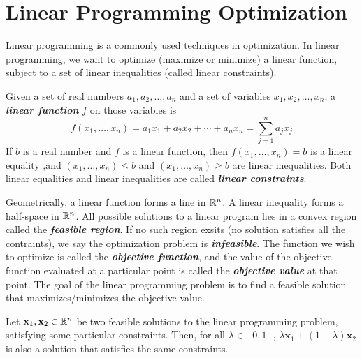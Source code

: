 \section{Linear Programming Optimization}

Linear programming is a commonly used techniques in optimization. In linear programming, we want to optimize (maximize or minimize) a linear function, subject to a set of linear inequalities (called linear constraints). 

\begin{definition}    
    Given a set of real numbers $a_1,a_2,\ldots,a_n$ and a set of variables $x_1,x_2,\ldots,x_n$, a \textit{\textbf{linear function}} $f$ on those variables is
    $$
    f(x_1,\ldots,x_n) = a_1x_1 + a_2x_2 + \cdots + a_nx_n = \sum_{j=1}^n a_jx_j
    $$
    If $b$ is a real number and $f$ is a linear function, then $f(x_1,\ldots,x_n) = b$ is a linear equality ,and $(x_1,\ldots,x_n) \leq b$ and $(x_1,\ldots,x_n) \geq b$ are linear inequalities. Both linear equalities and linear inequalities are called \textit{\textbf{linear constraints}}.
\end{definition}

Geometrically, a linear function forms a line in $\mathbb{R}^n$. A linear inequality forms a half-space in $\mathbb{R}^n$. All possible solutions to a linear program lies in a convex region called the \textit{\textbf{feasible region}}. If no such region exsits (no solution satisfies all the contraints), we say the optimization problem is \textit{\textbf{infeasible}}. The function we wish to optimize is called the \textit{\textbf{objective function}}, and the value of the objective function evaluated at a particular point is called the \textit{\textbf{objective value}} at that point. The goal of the linear programming problem is to find a feasible solution that maximizes/minimizes the objective value.

\begin{theorem}
    Let $\mathbf{x}_1,\mathbf{x}_2 \in \mathbb{R}^n$ be two feasible solutions to the linear programming problem, satisfying some particular constraints. Then, for all $\lambda \in [0,1]$, $\lambda\mathbf{x}_1 + (1-\lambda)\mathbf{x}_2$ is also a solution that satisfies the same constraints.
\end{theorem}

